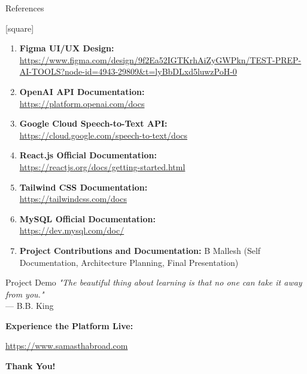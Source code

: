 \documentclass{beamer}
\begin{document}
\begin{frame}{References}

[square] %

\begin{enumerate}
    \item \textbf{Figma UI/UX Design:} \\
    \scriptsize \url{https://www.figma.com/design/9f2Ea52IGTKrhAiZyGWPkn/TEST-PREP-AI-TOOLS?node-id=4943-29809&t=lyBbDLxd5luwzPoH-0}

    \item \textbf{OpenAI API Documentation:} \\
    \scriptsize \url{https://platform.openai.com/docs}

    \item \textbf{Google Cloud Speech-to-Text API:} \\
    \scriptsize \url{https://cloud.google.com/speech-to-text/docs}

    \item \textbf{React.js Official Documentation:} \\
    \scriptsize \url{https://reactjs.org/docs/getting-started.html}

    \item \textbf{Tailwind CSS Documentation:} \\
    \scriptsize \url{https://tailwindcss.com/docs}

    \item \textbf{MySQL Official Documentation:} \\
    \scriptsize \url{https://dev.mysql.com/doc/}

    \item \textbf{Project Contributions and Documentation:} B Mallesh (Self Documentation, Architecture Planning, Final Presentation)
\end{enumerate}

\end{frame}




\begin{frame}{Project Demo}
  \centering
  \textit{"The beautiful thing about learning is that no one can take it away from you."} \\
  \vspace{0.6cm}
  --- B.B. King
  
  \vspace{1.2cm}
  \textbf{Experience the Platform Live:}
  
  \vspace{0.5cm}
  \url{https://www.samasthabroad.com}
  
  \vspace{1.5cm}
  \textbf{Thank You!}
\end{frame}




\end{document}
